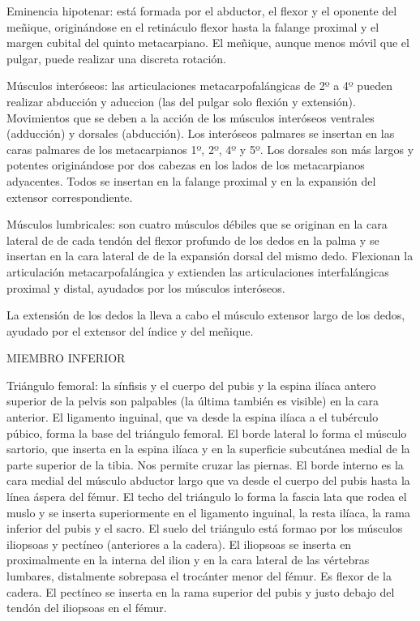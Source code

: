 Eminencia hipotenar: está formada por el abductor, el flexor y el oponente del meñique, originándose en el retináculo flexor hasta la falange proximal y el margen cubital del quinto metacarpiano. El meñique, aunque menos móvil que el pulgar, puede realizar una discreta rotación.

Músculos interóseos: las articulaciones metacarpofalángicas de 2º a 4º pueden realizar abducción y aduccion (las del pulgar solo flexión y extensión). Movimientos que se deben a la acción de los músculos interóseos ventrales (adducción) y dorsales (abducción). Los interóseos palmares se insertan en las caras palmares de los metacarpianos 1º, 2º, 4º y 5º. Los dorsales son más largos y potentes originándose por dos cabezas en los lados de los metacarpianos adyacentes. Todos se insertan en la falange proximal y en la expansión del extensor correspondiente.

Músculos lumbricales: son cuatro músculos débiles que se originan en la cara lateral de de cada tendón del flexor profundo de los dedos en la palma y se insertan en la cara lateral de de la expansión dorsal del mismo dedo. Flexionan la articulación metacarpofalángica y extienden las articulaciones interfalángicas proximal y distal, ayudados por los músculos interóseos.

La extensión de los dedos la lleva a cabo el músculo extensor largo de los dedos, ayudado por el extensor del índice y del meñique.

MIEMBRO INFERIOR

Triángulo femoral: la sínfisis y el cuerpo del pubis y la espina ilíaca antero superior de la pelvis son palpables (la última también es visible) en la cara anterior. El ligamento inguinal, que va desde la espina ilíaca a el tubérculo púbico, forma la base del triángulo femoral. El borde lateral lo forma el músculo sartorio, que inserta en la espina ilíaca y en la superficie subcutánea medial de la parte superior de la tibia. Nos permite cruzar las piernas. El borde interno es la cara medial del músculo abductor largo que va desde el cuerpo del pubis hasta la línea áspera del fémur. El techo del triángulo lo forma la fascia lata que rodea el muslo y se inserta superiormente  en el ligamento inguinal, la resta ilíaca, la rama inferior del pubis y el sacro. El suelo del triángulo está formao por los músculos iliopsoas y pectíneo (anteriores a la cadera). El iliopsoas se inserta en proximalmente en la interna del ilion y en la cara lateral de las vértebras lumbares, distalmente sobrepasa el trocánter menor del fémur. Es flexor de la cadera. El pectíneo se inserta en la rama superior del pubis y justo debajo del tendón del iliopsoas en el fémur.

